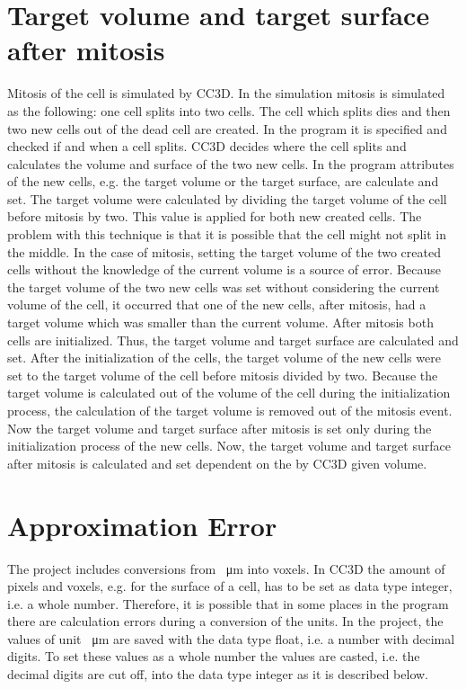 \section{Target volume and target surface after mitosis} \label{sec:TargetVolumeSurfaceAfterMitosis}
Mitosis of the cell is simulated by \ac{CC3D}. In the simulation mitosis is simulated as the following: one cell splits into two cells. The cell which splits dies and then two new cells out of the dead cell are created. \newline
In the program it is specified and checked if and when a cell splits. \ac{CC3D} decides where the cell splits and calculates the volume and surface of the two new cells. In the program attributes of the new cells, e.g. the target volume or the target surface, are calculate and set. \newline 
The target volume were calculated by dividing the target volume of the cell before mitosis by two. This value is applied for both new created cells. The problem with this technique is that it is possible that the cell might not split in the middle. In the case of mitosis, setting the target volume of the two created cells without the knowledge of the current volume is a source of error. Because the target volume of the two new cells was set without considering the current volume of the cell, it occurred that one of the new cells, after mitosis, had a target volume which was smaller than the current volume. \newline
After mitosis both cells are initialized. Thus, the target volume and target surface are calculated and set. After the initialization of the cells, the target volume of the new cells were set to the target volume of the cell before mitosis divided by two. \newline
Because the target volume is calculated out of the volume of the cell during the initialization process, the calculation of the target volume is removed out of the mitosis event. Now the target volume and target surface after mitosis is set only during the initialization process of the new cells. \newline
Now, the target volume and target surface after mitosis is calculated and set dependent on the by \ac{CC3D} given volume.



\section{Approximation Error} \label{sec:ApproximationError}
The project includes conversions from \SI{}{\micro\metre} into voxels. In \ac{CC3D} the amount of pixels and voxels, e.g. for the surface of a cell, has to be set as data type integer, i.e. a whole number. Therefore, it is possible that in some places in the program there are calculation errors during a conversion of the units. In the project, the values of unit \SI{}{\micro\metre} are saved with the data type float, i.e. a number with decimal digits. To set these values as a whole number the values are casted, i.e. the decimal digits are cut off, into the data type integer as it is described below. 

